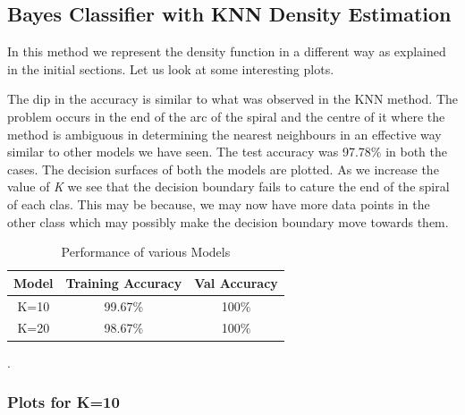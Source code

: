 \newpage
\subsection{Bayes Classifier with KNN Density Estimation}
In this method we represent the density function in a different way as explained in the initial sections. Let us look at some interesting plots.

The dip in the accuracy is similar to what was observed in the KNN method. The problem occurs in the end of the arc of the spiral and the centre of it where the method is ambiguous in determining the nearest neighbours in an effective way similar to other models we have seen. The test accuracy was 97.78$\%$ in both the cases. The decision surfaces of both the models are plotted. As we increase the value of \textit{K} we see that the decision boundary fails to cature the end of the spiral of each clas. This may be because, we may now have more data points in the other class which may possibly make the decision boundary move towards them.

\hspace{5cm}
{
\begin{table}[!h]
\centering
\begin{tabular}{ |c|c|c|  }
\hline
\rowcolor{lightgray} Model & Training Accuracy & Val Accuracy \\
\hline
K=10 & 99.67$\%$  & 100$\%$ \\   
 \hline
K=20 & 98.67$\%$  & 100$\%$ \\ 
\hline
\end{tabular}
\caption{Performance of various Models}.
\label{table:6}
\end{table}
}

\newpage
\subsubsection{Plots for K=10}

